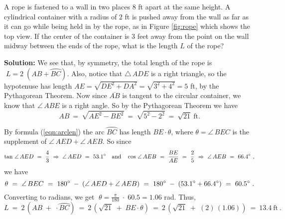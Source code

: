\begin{exmp}
\piccaption[]{\label{fig:rope}}
\noindent A rope is fastened to a wall in two places $8$ ft apart at the same height. A cylindrical container
 with a radius of $2$ ft is pushed away from the wall as far as it can go while being held in by
 the rope, as in Figure \ref{fig:rope} which shows the top view. If the center of the
 container is $3$ feet away from the point on the wall midway between the ends of the rope, what
 is the length $L$ of the rope?\vspace{1mm}
 \par\noindent\textbf{Solution:} We see that, by symmetry, the total length of the rope is
 $\;L = 2\;(AB + \wideparen{BC})$.
 Also, notice that $\triangle\,ADE$ is a right triangle, so the hypotenuse
 has length $AE = \sqrt{DE^2 + DA^2} = \sqrt{3^2 + 4^2} = 5$ ft,  by the Pythagorean Theorem.
 Now since $\overline{AB}$ is tangent to the circular container, we know that $\angle\,ABE$ is a
 right angle. So by the Pythagorean Theorem we have
 \begin{displaymath}
  AB ~=~ \sqrt{AE^2 - BE^2} ~=~ \sqrt{5^2 - 2^2} ~=~ \sqrt{21} ~\text{ft}.
 \end{displaymath}

 \noindent By formula (\ref{eqn:arclen}) the arc $\wideparen{BC}$ has length $BE \cdot \theta$,
 where $\theta = \angle\,BEC$ is the supplement of $\angle\,AED + \angle\,AEB$. So since
 \begin{displaymath}
  \tan\,\angle\,AED ~=~ \frac{4}{3} ~\Rightarrow~ \angle\,AED ~=~ 53.1^\circ \quad\text{and}\quad
  \cos\,\angle\,AEB ~=~ \frac{BE}{AE} ~=~ \frac{2}{5} ~\Rightarrow~ \angle\,AEB ~=~ 66.4^\circ ~,
 \end{displaymath}
 we have
 \begin{displaymath}
  \theta ~=~ \angle\,BEC ~=~ 180^\circ \;-\; (\angle\,AED + \angle\,AEB) ~=~ 180^\circ \;-\;
  (53.1^\circ + 66.4^\circ) ~=~ 60.5^\circ ~.
 \end{displaymath}
 Converting to radians, we get $\;\theta = \frac{\pi}{180} \;\cdot\; 60.5 = 1.06$ rad. Thus,
 \begin{displaymath}
  L ~=~ 2\,(AB \;+\; \cdot \wideparen{BC}) ~=~ 2\,(\sqrt{21} \;+\; BE \cdot \theta) ~=~
   2\,(\sqrt{21} \;+\; (2)\,( 1.06)) ~=~ \boxed{13.4 ~\text{ft}} ~.
 \end{displaymath}
\end{exmp}
